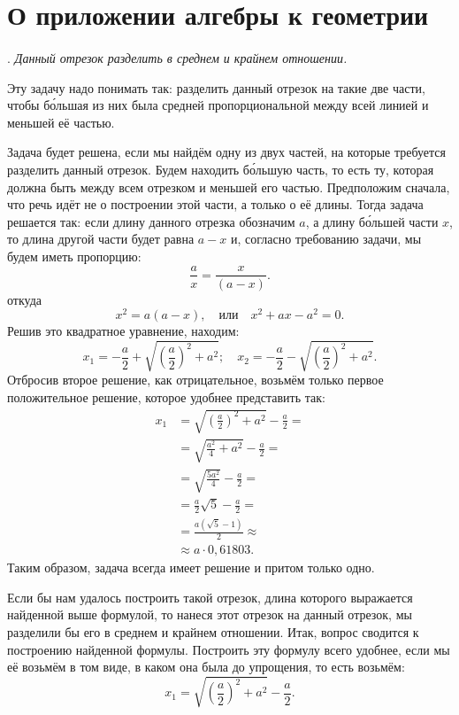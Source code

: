 \documentclass[twoside]{book}
\begin{document}
\section{О приложении алгебры к геометрии}

\paragraph{}\label{1938/209}
.
\emph{Данный отрезок разделить в среднем и крайнем отношении.}

Эту задачу надо понимать так:
разделить данный отрезок на такие две части, чтобы б\'{о}льшая из них была средней пропорциональной между всей линией и меньшей её частью.

Задача будет решена, если мы найдём одну из двух частей, на которые требуется разделить данный отрезок.
Будем находить б\'{о}льшую часть, то есть ту, которая должна быть  между всем отрезком и меньшей его частью.
Предположим сначала, что речь идёт не о построении этой части, а только о  её длины.
Тогда задача решается  так:
если длину данного отрезка обозначим $a$, а длину б\'{о}льшей части $x$, то длина другой части будет равна $a-x$ и, согласно требованию задачи, мы будем иметь пропорцию:
\[\frac ax=\frac x{(a-x)}.\]
откуда
\[x^2=a(a-x),
\quad\text{или}\quad
x^2+ax-a^2=0.\]
Решив это квадратное уравнение, находим:
\[
x_1=-\frac a2 + \sqrt{\left(\frac a2\right)^2+a^2};
\quad
x_2=-\frac a2 - \sqrt{\left(\frac a2\right)^2+a^2}.
\]
Отбросив второе решение, как отрицательное, возьмём только первое положительное решение, которое удобнее представить так:
\begin{align*}
x_1&= \sqrt{\left(\frac a2\right)^2+a^2}-\frac a2 =
\\
&= \sqrt{\frac {a^2}4+a^2}-\frac a2 =
\\
&= \sqrt{\frac {5a^2}4}-\frac a2 =
\\
&= \frac a2\sqrt{5}-\frac a2 =
\\
&= \frac {a(\sqrt{5}-1)}2 \approx
\\
&\approx a\cdot 0{,}61803.
\end{align*}
Таким образом, задача всегда имеет решение и притом только одно.

Если бы нам удалось построить такой отрезок, длина которого выражается найденной выше формулой, то нанеся этот отрезок на данный отрезок, мы разделили бы его в среднем и крайнем отношении.
Итак, вопрос сводится к построению найденной формулы.
Построить эту формулу всего удобнее, если мы её возьмём в том виде, в каком она была до упрощения, то есть возьмём:
\[x_1= \sqrt{\left(\frac a2\right)^2+a^2}-\frac a2.\]
\end{document}

